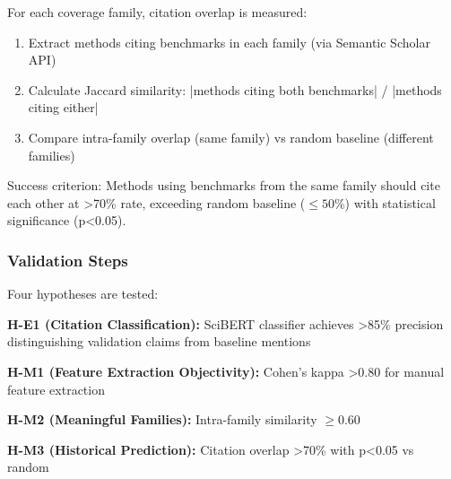 For each coverage family, citation overlap is measured:

\begin{enumerate}
\item Extract methods citing benchmarks in each family (via Semantic Scholar API)
\item Calculate Jaccard similarity: |methods citing both benchmarks| / |methods citing either|
\item Compare intra-family overlap (same family) vs random baseline (different families)
\end{enumerate}

Success criterion: Methods using benchmarks from the same family should cite each other at >70\% rate, exceeding random baseline ($\leq 50$\%) with statistical significance (p<0.05).

\subsubsection{Validation Steps}

Four hypotheses are tested:

\textbf{H-E1 (Citation Classification):} SciBERT classifier achieves >85\% precision distinguishing validation claims from baseline mentions

\textbf{H-M1 (Feature Extraction Objectivity):} Cohen's kappa >0.80 for manual feature extraction

\textbf{H-M2 (Meaningful Families):} Intra-family similarity $\geq 0.60$

\textbf{H-M3 (Historical Prediction):} Citation overlap >70\% with p<0.05 vs random
